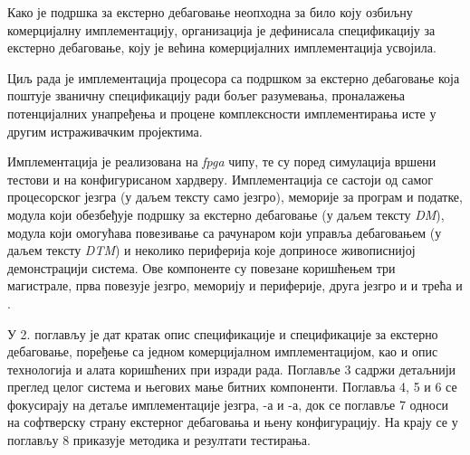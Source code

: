 Како је подршка за екстерно дебаговање неопходна за било коју озбиљну комерцијалну имплементацију,  организација је дефинисала спецификацију за екстерно дебаговање\cite{debug_spec}, коју је већина комерцијалних имплементација усвојила.\newpage

Циљ рада је имплементација  процесора са подршком за екстерно дебаговање која поштује званичну спецификацију\cite{debug_spec} ради бољег разумевања, проналажења потенцијалних унапређења и процене комплексности имплементирања исте у другим истраживачким пројектима.

Имплементација је реализована на \textit{\acrfull{fpga}} чипу, те су поред симулација вршени тестови и на конфигурисаном хардверу.
Имплементација се састоји од самог  процесорског језгра (у даљем тексту само језгро), меморије за програм и податке, модула који обезбеђује подршку за екстерно дебаговање (у даљем тексту \textit{\acrfull{DM}}), модула који омогућава повезивање са рачунаром који управља дебаговањем (у даљем тексту \textit{\acrfull{DTM}}) и неколико периферија које доприносе живописнијој демонстрацији система. Ове компоненте су повезане коришћењем три магистрале, прва повезује језгро, меморију и периферије, друга језгро и  и трећа  и .

У 2. поглављу је дат кратак опис  спецификације\cite{riscv_spec} и спецификације за екстерно дебаговање\cite{debug_spec}, поређење са једном комерцијалном имплементацијом, као и опис технологија и алата коришћених при изради рада.
Поглавље 3 садржи детаљнији преглед целог система и његових мање битних компоненти.
Поглавља 4, 5 и 6 се фокусирају на детаље имплементације језгра, -а и -а, док се поглавље 7 односи на софтверску страну екстерног дебаговања и њену конфигурацију.
На крају се у поглављу 8 приказује методика и резултати тестирања.
